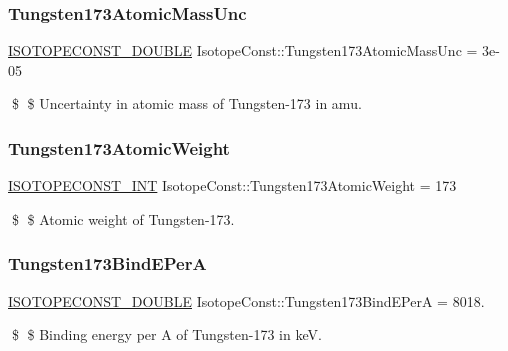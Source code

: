 \subsubsection{\texorpdfstring{Tungsten173\+Atomic\+Mass\+Unc}{Tungsten173AtomicMassUnc}}
{\footnotesize\ttfamily \mbox{\hyperlink{group___isotope_const-_macros_ga8f45a7272ce02c0b4c65c44636ed719a}{I\+S\+O\+T\+O\+P\+E\+C\+O\+N\+S\+T\+\_\+\+D\+O\+U\+B\+LE}} Isotope\+Const\+::\+Tungsten173\+Atomic\+Mass\+Unc = 3e-\/05}

\$ \$ Uncertainty in atomic mass of Tungsten-\/173 in amu. \mbox{\label{group___isotope_const-_tungsten-_w173_gab74971db9906d505489a6f70b06130c0}} 
\subsubsection{\texorpdfstring{Tungsten173\+Atomic\+Weight}{Tungsten173AtomicWeight}}
{\footnotesize\ttfamily \mbox{\hyperlink{group___isotope_const-_macros_ga5f18360b3e99483a35c32d789e62621c}{I\+S\+O\+T\+O\+P\+E\+C\+O\+N\+S\+T\+\_\+\+I\+NT}} Isotope\+Const\+::\+Tungsten173\+Atomic\+Weight = 173}

\$ \$ Atomic weight of Tungsten-\/173. \mbox{\label{group___isotope_const-_tungsten-_w173_ga5ee418e0a89ddaa6f2de4aaf05e0a4aa}} 
\subsubsection{\texorpdfstring{Tungsten173\+Bind\+E\+PerA}{Tungsten173BindEPerA}}
{\footnotesize\ttfamily \mbox{\hyperlink{group___isotope_const-_macros_ga8f45a7272ce02c0b4c65c44636ed719a}{I\+S\+O\+T\+O\+P\+E\+C\+O\+N\+S\+T\+\_\+\+D\+O\+U\+B\+LE}} Isotope\+Const\+::\+Tungsten173\+Bind\+E\+PerA = 8018.}

\$ \$ Binding energy per A of Tungsten-\/173 in keV. \mbox{\label{group___isotope_const-_tungsten-_w173_ga14e1ac9433b2c2f12731c9820aff8e25}} 
